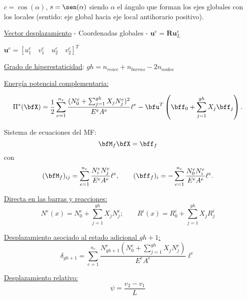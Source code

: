 \vspace{-0.2cm}
$c=\cos(\alpha)$, $s=\sen(\alpha)$ siendo $\alpha$ el ángulo que forman los ejes globales con los locales (sentido: eje global hacia eje local antihorario positivo).

\vspace{0.3cm}
\underline{Vector desplazamiento} - Coordenadas globales - $\textbf{u}^e=\textbf{R} \textbf{u}_ L^e$

\vspace{0.3cm}
$\textbf{u}^e=[u_1^e \quad v_1^e  \quad u_2^e \quad v_2^e]^T$ \centering


\begin{center}
\end{center}


\underline{Grado de hiperestaticidad}: $gh = n_{reacc} + n_{barras} - 2 n_{nodos}$\raggedright

\vspace{0.3cm}
\underline{Energía potencial complementaria:}\raggedright

$$
\Pi^* (\bfX) = \frac{1}{2}  \sum_{e=1}^{n_e} \frac{(N_0^e + \sum_{j=1}^{gh} X_j N_j^e)^2}{E^e A^e} \ell^e - \bfu^T \left( \bff_0 +  \sum_{j=1}^{gh} X_j \bff_j \right).
$$


Sistema de ecuaciones del MF:
$$
\bfM_f \bfX = \bff_f
$$
%
con
$$
(\bfM_f)_{ij} =  \sum_{e=1}^{n_e} \frac{N_i^e N_j^e }{E^e A^e} \ell^e,
\qquad
(\bff_f)_{i} =  - \sum_{e=1}^{n_e} \frac{N_0^e N_i^e }{E^e A^e} \ell^e.
$$

\underline{Directa en las barras y reacciones:}
$$
N^e (x)=N_0^e +  \sum_{j=1}^{gh} X_j N_j^e ;
\qquad
R^i(x)=R_0^i +  \sum_{j=1}^{gh} X_j R_j^i
$$

\underline{Desplazamiento asociado al estado adicional $gh+1$:}
$$
\delta_{gh+1}= \sum_{e=1}^{n_e} \frac{N_{gh+1}^e (N_0^e + \sum_{j=1}^{gh} X_j N_j^e)}{E^e A^e} \ell^e 
$$

\begin{center}
\end{center}

\begin{center}
 \def\svgwidth{0.75\textwidth}
 
\end{center}

\underline{Desplazamiento relativo:}
$$\psi=\frac{v_2 - v_1}{L}$$

